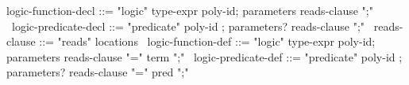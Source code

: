 \begin{syntax}
  logic-function-decl ::= "logic" type-expr poly-id;
  parameters reads-clause ";"
  \
  logic-predicate-decl ::= "predicate" poly-id ;
  parameters? reads-clause ";"
  \
  reads-clause ::= "reads" locations
  \
  logic-function-def ::= "logic" type-expr poly-id;
                         parameters {reads-clause} "=" term ";"
  \
  logic-predicate-def ::= "predicate" poly-id ;
  parameters? {reads-clause} "=" pred ";"
\end{syntax}